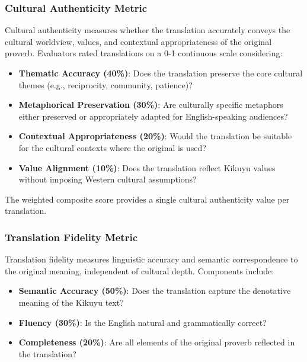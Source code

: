 \subsubsection{Cultural Authenticity Metric}
\label{subsubsec:cultural_authenticity}

Cultural authenticity measures whether the translation accurately conveys the cultural worldview, values, and contextual appropriateness of the original proverb. Evaluators rated translations on a 0-1 continuous scale considering:

\begin{itemize}
    \item \textbf{Thematic Accuracy (40\%)}: Does the translation preserve the core cultural themes (e.g., reciprocity, community, patience)?
    
    \item \textbf{Metaphorical Preservation (30\%)}: Are culturally specific metaphors either preserved or appropriately adapted for English-speaking audiences?
    
    \item \textbf{Contextual Appropriateness (20\%)}: Would the translation be suitable for the cultural contexts where the original is used?
    
    \item \textbf{Value Alignment (10\%)}: Does the translation reflect Kikuyu values without imposing Western cultural assumptions?
\end{itemize}

The weighted composite score provides a single cultural authenticity value per translation.

\subsubsection{Translation Fidelity Metric}
\label{subsubsec:translation_fidelity}

Translation fidelity measures linguistic accuracy and semantic correspondence to the original meaning, independent of cultural depth. Components include:

\begin{itemize}
    \item \textbf{Semantic Accuracy (50\%)}: Does the translation capture the denotative meaning of the Kikuyu text?
    
    \item \textbf{Fluency (30\%)}: Is the English natural and grammatically correct?
    
    \item \textbf{Completeness (20\%)}: Are all elements of the original proverb reflected in the translation?
\end{itemize}

